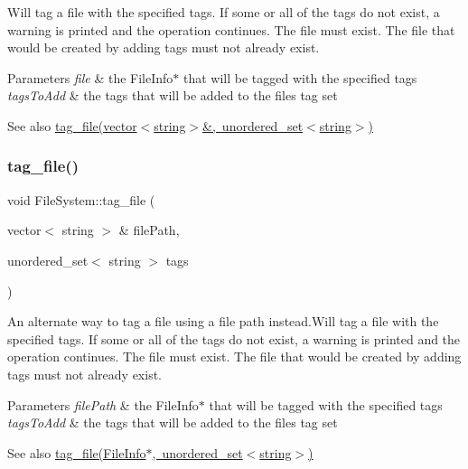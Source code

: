 Will tag a file with the specified tags. If some or all of the tags do not exist, a warning is printed and the operation continues. The file must exist. The file that would be created by adding tags must not already exist. 
\begin{DoxyParams}{Parameters}
{\em file} & the File\+Info$\ast$ that will be tagged with the specified tags \\
\hline
{\em tags\+To\+Add} & the tags that will be added to the file\textquotesingle{}s tag set \\
\hline
\end{DoxyParams}
\begin{DoxySeeAlso}{See also}
\mbox{\hyperlink{class_file_system_a7d761ee2fa4d0c2965b5d3c7a75e7fdc}{tag\+\_\+file(vector$<$string$>$\&, unordered\+\_\+set$<$string$>$)}} 
\end{DoxySeeAlso}
\mbox{\label{class_file_system_a7d761ee2fa4d0c2965b5d3c7a75e7fdc}} 
\subsubsection{\texorpdfstring{tag\+\_\+file()}{tag\_file()}\hspace{0.1cm}{\footnotesize\ttfamily [2/2]}}
{\footnotesize\ttfamily void File\+System\+::tag\+\_\+file (\begin{DoxyParamCaption}\item[{vector$<$ string $>$ \&}]{file\+Path,  }\item[{unordered\+\_\+set$<$ string $>$}]{tags }\end{DoxyParamCaption})}

An alternate way to tag a file using a file path instead.\+Will tag a file with the specified tags. If some or all of the tags do not exist, a warning is printed and the operation continues. The file must exist. The file that would be created by adding tags must not already exist. 
\begin{DoxyParams}{Parameters}
{\em file\+Path} & the File\+Info$\ast$ that will be tagged with the specified tags \\
\hline
{\em tags\+To\+Add} & the tags that will be added to the file\textquotesingle{}s tag set \\
\hline
\end{DoxyParams}
\begin{DoxySeeAlso}{See also}
\mbox{\hyperlink{class_file_system_a33649a9100b30978db80654ece6504f4}{tag\+\_\+file(\+File\+Info$\ast$, unordered\+\_\+set$<$string$>$)}} 
\end{DoxySeeAlso}
\mbox{\label{class_file_system_afb76c092b6ab19c9609e1707e5bdfe1b}} 
